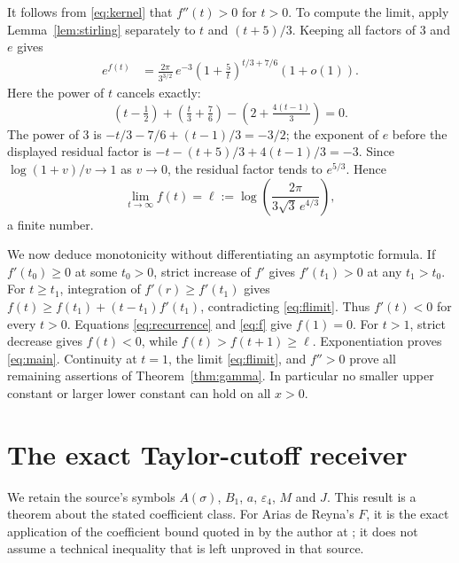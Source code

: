 \documentclass[11pt]{article}
\newcommand{\eps}{\varepsilon}
\begin{document}
It follows from \eqref{eq:kernel} that $f''(t)>0$ for $t>0$.
To compute the limit, apply Lemma~\ref{lem:stirling} separately to
$t$ and $(t+5)/3$. Keeping all factors of $3$ and $e$ gives
\begin{align}
e^{f(t)}
&=\frac{2\pi}{3^{3/2}}\,e^{-3}
\left(1+\frac5t\right)^{t/3+7/6}(1+o(1)).\label{eq:ratio-asymptotic}
\end{align}
Here the power of $t$ cancels exactly:
\[
(t-\tfrac12)+(\tfrac t3+\tfrac76)
-\left(2+\tfrac{4(t-1)}3\right)=0.
\]
The power of $3$ is $-t/3-7/6+(t-1)/3=-3/2$; the exponent of $e$
before the displayed residual factor is
$-t-(t+5)/3+4(t-1)/3=-3$.
Since $\log(1+v)/v\to1$ as $v\to0$, the residual factor tends
to $e^{5/3}$. Hence
\begin{equation}\label{eq:flimit}
\lim_{t\to\infty}f(t)=
\ell:=\log\left(\frac{2\pi}{3\sqrt3\,e^{4/3}}\right),
\end{equation}
a finite number.

We now deduce monotonicity without differentiating an asymptotic
formula. If $f'(t_0)\ge0$ at some $t_0>0$, strict increase of $f'$
gives $f'(t_1)>0$ at any $t_1>t_0$. For $t\ge t_1$, integration
of $f'(r)\ge f'(t_1)$ gives
$f(t)\ge f(t_1)+(t-t_1)f'(t_1)$, contradicting \eqref{eq:flimit}.
Thus $f'(t)<0$ for every $t>0$. Equations \eqref{eq:recurrence}
and \eqref{eq:f} give $f(1)=0$. For $t>1$, strict decrease gives
$f(t)<0$, while $f(t)>f(t+1)\ge\ell$. Exponentiation proves
\eqref{eq:main}. Continuity at $t=1$, the limit \eqref{eq:flimit},
and $f''>0$ prove all remaining assertions of
Theorem~\ref{thm:gamma}. In particular no smaller upper constant
or larger lower constant can hold on all $x>0$.

\section{The exact Taylor-cutoff receiver}\label{sec:taylor}
We retain the source's symbols $A(\sigma)$, $B_1$, $a$,
$\eps_4$, $M$ and $J$. This result is a theorem about the stated
coefficient class. For Arias de Reyna's $F$, it is the exact
application of the coefficient bound quoted in
\cite[formulas (47) and (56)]{AriasI} by the author at
\cite[\texttt{PropAprTaylor}]{AriasII}; it does not assume a
technical inequality that is left unproved in that source.
\end{document}

